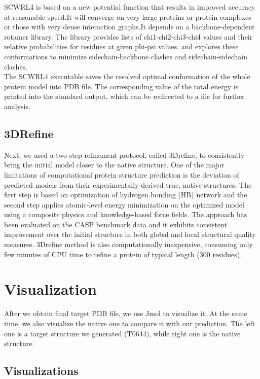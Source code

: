 \documentclass{article}
\begin{document}
SCWRL4 is based on a new potential function that results in improved accuracy at reasonable speed.It will converge on very large proteins or protein complexes or those with very dense interaction graphs.It depends on a backbone-dependent rotamer library. The library provides lists of chi1-chi2-chi3-chi4 values and their relative probabilities for residues at given phi-psi values, and explores these conformations to minimize sidechain-backbone clashes and sidechain-sidechain clashes.\\

The SCWRL4 executable saves the resolved optimal conformation of the whole protein model into PDB file. The corresponding value of the total energy is printed into the standard output, which can be redirected to a file for further analysis.

\subsection{3DRefine}

Next, we used a two-step refinement protocol, called 3Drefine, to consistently bring the initial model closer to the native structure.  One of the major limitations of computational protein structure prediction is the deviation of predicted models from their experimentally derived true, native structures.  The first step is based on optimization of hydrogen bonding (HB) network and the second step applies atomic-level energy minimization on the optimized model using a composite physics and knowledge-based force fields. The approach has been evaluated on the CASP benchmark data and it exhibits consistent improvement over the initial structure in both global and local structural quality measures. 3Drefine method is also computationally inexpensive, consuming only few minutes of CPU time to refine a protein of typical length (300 residues).

\section{Visualization}

After we obtain final target PDB file, we use Jmol to visualize it. At the same time, we also visualize the native one to compare it with our prediction.  The left one is a target structure we generated (T0644), while right one is the native structure.

\subsection{Visualizations}
\end{document}
